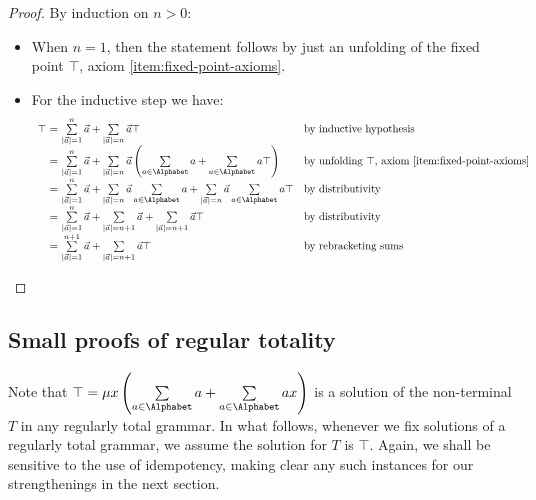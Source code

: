 \documentclass[runningheads]{amsart}
\begin{document}
\begin{proof}
    By induction on $n>0$:
    \begin{itemize}
        \item When $n=1$, then the statement follows by just an unfolding of the fixed point $\top$, axiom \eqref{item:fixed-point-axioms}.
        \item For the inductive step we have:
        \[
        \begin{array}{r@{\ = \ }ll}
             \top & \sum\limits_{|\vec a|=1}^{n}\vec a + \sum\limits_{|\vec a|= n} \vec a \top & \text{by inductive hypothesis} \\
                & \sum\limits_{|\vec a|=1}^{n}\vec a + \sum\limits_{|\vec a|= n} \vec a \left(\sum\limits_{a \in \Alphabet} a + \sum\limits_{a\in \Alphabet} a\top \right) & \text{by unfolding $\top$, axiom \eqref{item:fixed-point-axioms}} \\
                & \sum\limits_{|\vec a|=1}^{n}\vec a + \sum\limits_{|\vec a|= n} \vec a \sum\limits_{a \in \Alphabet} a + \sum\limits_{|\vec a|= n} \vec a\sum\limits_{a\in \Alphabet} a\top & \text{by distributivity} \\
                & \sum\limits_{|\vec a|=1}^{n}\vec a + \sum\limits_{|\vec a|= n+1} \vec a + \sum\limits_{|\vec a|= n+1} \vec a\top & \text{by distributivity} \\
                & \sum\limits_{|\vec a|=1}^{n+1}\vec a + \sum\limits_{|\vec a|= n+1} \vec a\top & \text{by rebracketing sums} \qedhere
        \end{array}
        \]
    \end{itemize}
\end{proof}

\subsection{Small proofs of regular totality}

Note that $\top =\mu x \left(\sum\limits_{a \in \Alphabet} a + \sum\limits_{a\in \Alphabet} ax \right)$ is a solution of the non-terminal $T$ in any regularly total grammar.
In what follows, whenever we fix solutions of a regularly total grammar, we assume the solution for $T$ is $\top$.
Again, we shall be sensitive to the use of idempotency, making clear any such instances for our strengthenings in the next section.
\end{document}

